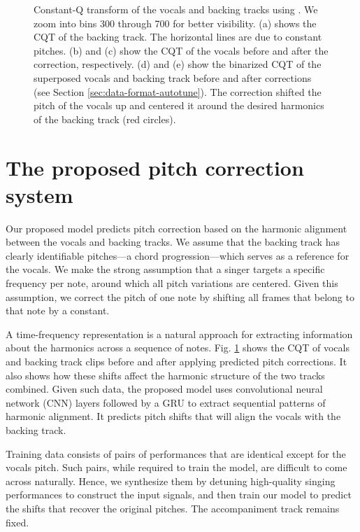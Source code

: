 \begin{figure}[t]
    \caption{
    Constant-Q transform of the vocals and backing tracks using \cite{mcfee2015librosa}. We zoom into bins 300 through 700 for better visibility. (a) shows the CQT of the backing track. The horizontal lines are due to constant pitches. (b) and (c) show the CQT of the vocals before and after the correction, respectively. (d) and (e) show the binarized CQT of the superposed vocals and backing track before and after corrections (see Section \ref{sec:data-format-autotune}). The correction shifted the pitch of the vocals up and centered it around the desired harmonics of the backing track (red circles). 
    }
    \label{fig:model-input-autotune}
\end{figure}

\section{The proposed pitch correction system}
\label{sec:proposed-autotune}
Our proposed model predicts pitch correction based on the harmonic alignment between the vocals and backing tracks. We assume that the backing track has clearly identifiable pitches---a chord progression---which serves as a reference for the vocals. We make the strong assumption that a singer targets a specific frequency per note, around which all pitch variations are centered. Given this assumption, we correct the pitch of one note by shifting all frames that belong to that note by a constant.

A time-frequency representation is a natural approach for extracting information about the harmonics across a sequence of notes. Fig. \ref{fig:model-input-autotune} shows the CQT of vocals and backing track clips before and after applying predicted pitch corrections. It also shows how these shifts affect the harmonic structure of the two tracks combined. Given such data, the proposed model uses convolutional neural network (CNN) layers followed by a GRU to extract sequential patterns of harmonic alignment. It predicts pitch shifts that will align the vocals with the backing track. 

Training data consists of pairs of performances that are identical except for the vocals pitch. Such pairs, while required to train the model, are difficult to come across naturally. Hence, we synthesize them by detuning high-quality singing performances to construct the input signals, and then train our model to predict the shifts that recover the original pitches. The accompaniment track remains fixed.  

